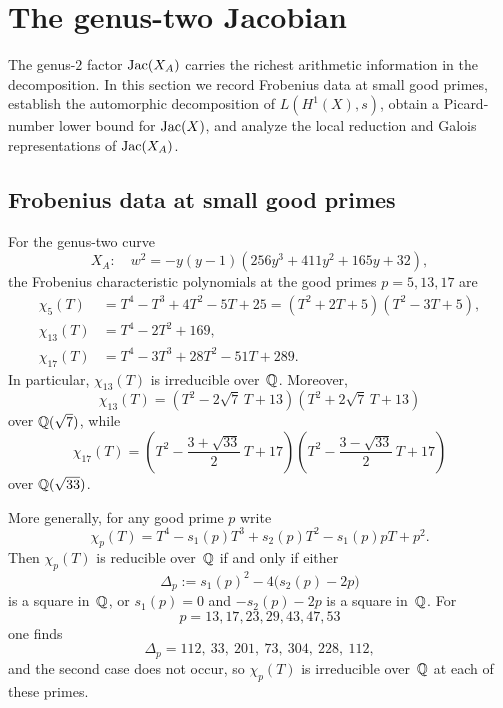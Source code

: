 \section{The genus-two Jacobian}

The genus-\(2\) factor \(\operatorname{Jac}(X_A)\) carries the richest arithmetic information in the decomposition. In this section we record Frobenius data at small good primes, establish the automorphic decomposition of \(L(H^1(X),s)\), obtain a Picard-number lower bound for \(\operatorname{Jac}(X)\), and analyze the local reduction and Galois representations of \(\operatorname{Jac}(X_A)\).

\subsection{Frobenius data at small good primes}

\begin{proposition}\label{thm:simple}
For the genus-two curve
\[
X_A:\quad w^2=-y(y-1)(256y^3+411y^2+165y+32),
\]
the Frobenius characteristic polynomials at the good primes \(p=5,13,17\) are
\begin{align}
\chi_5(T)&=T^4-T^3+4T^2-5T+25=(T^2+2T+5)(T^2-3T+5),\label{eq:chi5-factor}\\
\chi_{13}(T)&=T^4-2T^2+169,\label{eq:chi13}\\
\chi_{17}(T)&=T^4-3T^3+28T^2-51T+289.\label{eq:chi17}
\end{align}
In particular, \(\chi_{13}(T)\) is irreducible over~\(\mathbb{Q}\). Moreover,
\[
\chi_{13}(T)=(T^2-2\sqrt{7}\,T+13)(T^2+2\sqrt{7}\,T+13)
\]
over \(\mathbb{Q}(\sqrt{7})\), while
\[
\chi_{17}(T)=\left(T^2-\frac{3+\sqrt{33}}2\,T+17\right)\left(T^2-\frac{3-\sqrt{33}}2\,T+17\right)
\]
over \(\mathbb{Q}(\sqrt{33})\).

More generally, for any good prime \(p\) write
\[
\chi_p(T)=T^4-s_1(p)T^3+s_2(p)T^2-s_1(p)pT+p^2.
\]
Then \(\chi_p(T)\) is reducible over~\(\mathbb{Q}\) if and only if either
\[
\Delta_p:=s_1(p)^2-4\bigl(s_2(p)-2p\bigr)
\]
is a square in~\(\mathbb{Q}\), or \(s_1(p)=0\) and \(-s_2(p)-2p\) is a square in~\(\mathbb{Q}\). For
\[
p=13,17,23,29,43,47,53
\]
one finds
\[
\Delta_p=112,\ 33,\ 201,\ 73,\ 304,\ 228,\ 112,
\]
and the second case does not occur, so \(\chi_p(T)\) is irreducible over~\(\mathbb{Q}\) at each of these primes.
\end{proposition}

